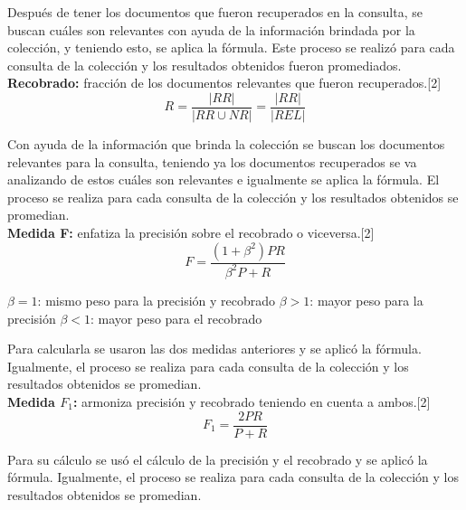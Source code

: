 \documentclass{llncs}
\begin{document}
Despu\'es de tener los documentos que fueron recuperados en la consulta, se buscan cu\'ales son relevantes con ayuda de la informaci\'on brindada por la colecci\'on, y teniendo esto, se aplica la f\'ormula. Este proceso se realiz\'o para cada consulta de la colecci\'on y los resultados obtenidos fueron promediados.\\

\textbf{Recobrado:} fracci\'on de los documentos relevantes que fueron recuperados.[2]\\

\begin{equation}
	R = \frac{|RR|}{|RR \cup NR|} = \frac{|RR|}{|REL|}
\end{equation}
 
Con ayuda de la informaci\'on que brinda la colecci\'on se buscan los documentos relevantes para la consulta, teniendo ya los documentos recuperados se va analizando de estos cu\'ales son relevantes e igualmente se aplica la f\'ormula. El proceso se realiza para cada consulta de la colecci\'on y los resultados obtenidos se promedian.\\

\textbf{Medida F:} enfatiza la precisi\'on sobre el recobrado o viceversa.[2]\\

\begin{equation}
	F = \frac{(1 + \beta^2)PR}{\beta^2P + R}
\end{equation}

$\beta = 1$: mismo peso para la precisi\'on y recobrado
$\beta > 1$: mayor peso para la precisi\'on
$\beta < 1$: mayor peso para el recobrado

Para calcularla se usaron las dos medidas anteriores y se aplic\'o la f\'ormula. Igualmente, el proceso se realiza para cada consulta de la colecci\'on y los resultados obtenidos se promedian.\\

\textbf{Medida $F_1$:} armoniza precisi\'on y recobrado teniendo en cuenta a ambos.[2]\\

\begin{equation}
	F_1 = \frac{2PR}{P + R}
\end{equation}
 
Para su c\'alculo se us\'o el c\'alculo de la precisi\'on y el recobrado y se aplic\'o la f\'ormula. Igualmente, el proceso se realiza para cada consulta de la colecci\'on y los resultados obtenidos se promedian.\\
\end{document}
